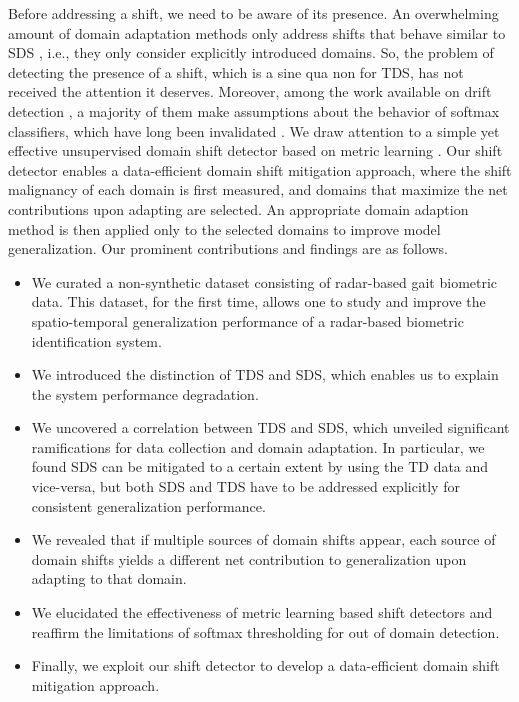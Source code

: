 \documentclass{article}
\begin{document}
Before addressing a shift, we need to be aware of its presence. An overwhelming amount of domain adaptation methods only address shifts that behave similar to SDS \cite{wang2018deep}, i.e., they only consider explicitly introduced domains. So, the problem of detecting the presence of a shift, which is a sine qua non for TDS, has not received the attention it deserves. Moreover, among the work available on drift detection \cite{rabanser2019failing}, a majority of them make assumptions about the behavior of softmax classifiers, which have long been invalidated \cite{gal2016dropout, snoek2019can}. We draw attention to a simple yet effective unsupervised domain shift detector based on metric learning \cite{kaya2019deep}.  Our shift detector enables a data-efficient domain shift mitigation approach, where the shift malignancy of each domain is first measured, and domains that maximize the net contributions upon adapting are selected. An appropriate domain adaption method is then applied only to the selected domains to improve model generalization. Our prominent contributions and findings are as follows.
\begin{itemize}[leftmargin=*]
  \item We curated a non-synthetic dataset consisting of radar-based gait biometric data. This dataset, for the first time, allows one to study and improve the spatio-temporal generalization performance of a radar-based biometric identification system.
  \item We introduced the distinction of TDS and SDS, which enables us to explain the system performance degradation. 
  \item We uncovered a correlation between TDS and SDS, which unveiled significant ramifications for data collection and domain adaptation. In particular, we found SDS can be mitigated to a certain extent by using the TD data and vice-versa, but both SDS and TDS have to be addressed explicitly for consistent generalization performance.    
  \item We revealed that if multiple sources of domain shifts appear, each source of domain shifts yields a different net contribution to generalization upon adapting to that domain.
  \item We elucidated the effectiveness of metric learning based shift detectors and reaffirm the limitations of softmax thresholding for out of domain detection. 
  \item Finally, we exploit our shift detector to develop a data-efficient domain shift mitigation approach.
\end{itemize}
\end{document}
